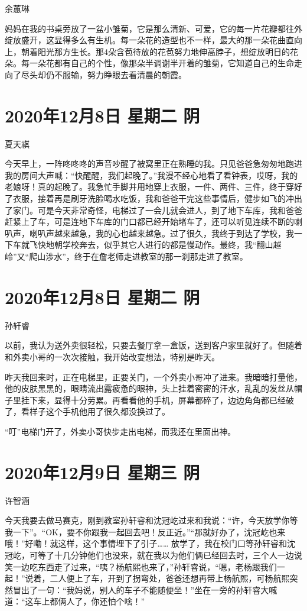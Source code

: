 余蕙琳

妈妈在我的书桌旁放了一盆小雏菊，它是那么清新、可爱，它的每一片花瓣都往外绽放盛开，这显得多么有生机。每一朵花的造型也不一样，最大的那一朵花曲直向上，朝着阳光那方生长。那4朵含苞待放的花苞努力地伸高脖子，想绽放明日的花朵。每一朵花都有自己的个性，像那朵半调谢半开着的雏菊，它知道自己的生命走向了尽头却仍不服输，努力睁眼去看清晨的朝霞。

\section{2020年12月8日 星期二 阴}

夏天祺

今天早上，一阵咚咚咚的声音吵醒了被窝里正在熟睡的我。只见爸爸急匆匆地跑进我的房间大声喊：“快醒醒，我们起晚了。”我漫不经心地看了看钟表，哎呀，我的老娘呀！真的起晚了。我急忙手脚并用地穿上衣服，一件、两件、三件，终于穿好了衣服，接着再是刷牙洗脸喝水吃饭，我和爸爸干完这些事情后，健步如飞的冲出了家门。可是今天非常奇怪，电梯过了一会儿就会进人，到了地下车库，我和爸爸赶紧上了车，可是连地下车库的门口都已经开始堵车了，还可以听见连续不断的喇叭声，喇叭声越来越急，我的心也越来越急。过了很久，我终于到达了学校，我一下车就飞快地朝学校奔去，似乎其它人进行的都是慢动作。最终，我“翻山越岭”又“爬山涉水”，终于在詹老师走进教室的那一刹那走进了教室。

\section{2020年12月8日 星期二 阴}

孙轩睿

以前，我认为送外卖很轻松，只要去餐厅拿一盒饭，送到客户家里就好了。但随着和外卖小哥的一次次接触，我开始改变想法，特别是昨天。

昨天我回来时，正在电梯里，正要关门，一个外卖小哥冲了进来。我暗暗打量他，他的皮肤黑黑的，眼睛流出露疲惫的眼神，头上挂着密密的汗水，乱乱的发丝从帽子里挂下来，显得十分劳累。再看看他的手机，屏幕都碎了，边边角角都已经破了，看样子这个手机他用了很久都没换过了。

“叮”电梯门开了，外卖小哥快步走出电梯，而我还在里面出神。

\section{2020年12月9日 星期三 阴}

许智涵

今天我要去做马赛克，刚到教室孙轩睿和沈冠屹过来和我说：“许，今天放学你等我一下”。“OK，要不你跟我一起回去吧！反正近。”“那就好办了，沈冠屹也来哦！”好嘞！就这样，这个事情埋下了引子…… 放学了，我在校门口等孙轩睿和沈冠屹，可等了十几分钟他们也没来，就在我以为他们俩已经回去时，三个人一边说笑一边吃东西走了过来，“咦？杨航熙也来了，”孙轩睿说，“嗯，老杨跟我们一起！”说着，二人便上了车，开到了拐弯处，爸爸还想再带上杨航熙，可杨航熙突然冒出了一句：“我妈说，别人的车子不能随便坐！”坐在一旁的孙轩睿大喊道：“这车上都俩人了，你还怕个啥！”

